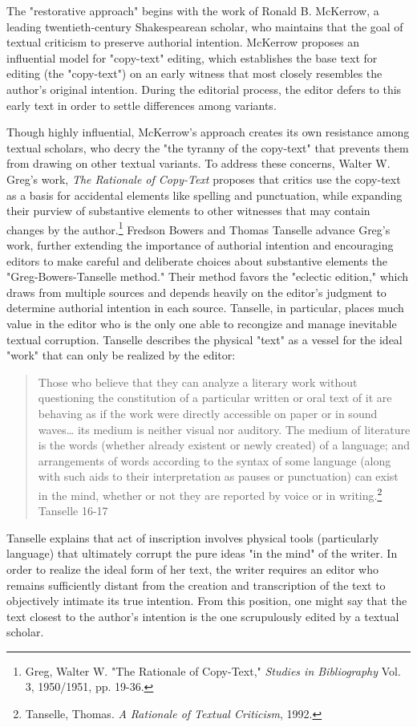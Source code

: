 \documentclass[11pt]{article}
\begin{document}
The "restorative approach" begins with the work of Ronald B. McKerrow,
a leading twentieth-century Shakespearean scholar, who maintains that
the goal of textual criticism to preserve authorial
intention. McKerrow proposes an influential model for "copy-text"
editing, which establishes the base text for editing (the "copy-text")
on an early witness that most closely resembles the author's original
intention. During the editorial process, the editor defers to this
early text in order to settle differences among variants.

Though highly influential, McKerrow's approach creates its own
resistance among textual scholars, who decry the "the tyranny of the
copy-text" that prevents them from drawing on other textual
variants. To address these concerns, Walter W. Greg's work, \emph{The
Rationale of Copy-Text} proposes that critics use the copy-text as a
basis for accidental elements like spelling and punctuation, while
expanding their purview of substantive elements to other witnesses
that may contain changes by the author.\footnote{Greg, Walter W. "The Rationale of Copy-Text," \emph{Studies in
Bibliography} Vol. 3, 1950/1951, pp. 19-36.} Fredson Bowers and
Thomas Tanselle advance Greg's work, further extending the importance
of authorial intention and encouraging editors to make careful and
deliberate choices about substantive elements the
"Greg-Bowers-Tanselle method." Their method favors the "eclectic
edition," which draws from multiple sources and depends heavily on the
editor's judgment to determine authorial intention in each
source. Tanselle, in particular, places much value in the editor who
is the only one able to recongize and manage inevitable textual
corruption. Tanselle describes the physical "text" as a vessel for the
ideal "work" that can only be realized by the editor:
\begin{quote}
Those who believe that they can analyze a literary work without
questioning the constitution of a particular written or oral text of
it are behaving as if the work were directly accessible on paper or in
sound waves\ldots{} its medium is neither visual nor auditory. The medium
of literature is the words (whether already existent or newly created)
of a language; and arrangements of words according to the syntax of
some language (along with such aids to their interpretation as pauses
or punctuation) can exist in the mind, whether or not they are
reported by voice or in writing.\footnote{Tanselle, Thomas. \emph{A Rationale of Textual Criticism}, 1992.} Tanselle 16-17
\end{quote}
Tanselle explains that act of inscription involves physical tools
(particularly language) that ultimately corrupt the pure ideas "in the
mind" of the writer. In order to realize the ideal form of her text,
the writer requires an editor who remains sufficiently distant from
the creation and transcription of the text to objectively intimate its
true intention. From this position, one might say that the text
closest to the author’s intention is the one scrupulously edited by a
textual scholar.
\end{document}
